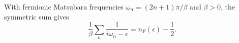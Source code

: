 \documentclass{article}
\begin{document}
With fermionic Matsubara frequencies $\omega_n = (2n+1)\pi/\beta$ and $\beta>0$, the symmetric sum gives
\begin{equation}
\frac{1}{\beta}\sum_{n} \frac{1}{i\omega_n - \epsilon} = n_F(\epsilon) - \frac{1}{2} .
\label{eq:occ}
\end{equation}
\end{document}
